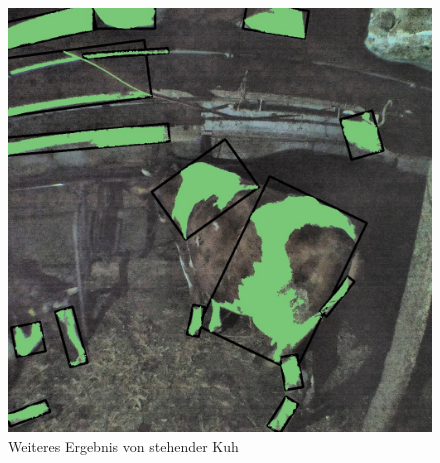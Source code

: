 \begin{figure}[H]
	\center
	\includegraphics[scale=0.1]{Grafiken/resultatStanding2.jpg}
	\caption{Weiteres Ergebnis von stehender Kuh} 
	\label{fig: Weiteres Ergebnis von stehender Kuh} 
\end{figure}



